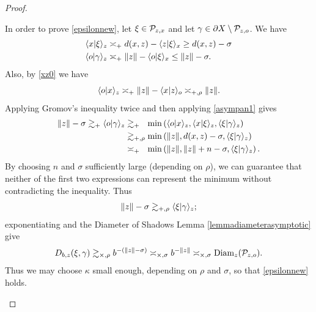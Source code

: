\begin{proof}
\begin{subproof}
In order to prove \eqref{epsilonnew}, let $\xi\in \mathcal P_{z,x}$ and let $\gamma\in \partial X\setminus \mathcal P_{z,o}$. We have
\begin{align*}
\langle x|\xi\rangle_z &\asymp_+ d(x,z) - \langle z|\xi\rangle_x \geq d(x,z) - \sigma\\
\langle o|\gamma\rangle_z &\asymp_+ \|z\| - \langle o|\xi\rangle_x \leq \|z\| - \sigma.
\end{align*}
Also, by \eqref{xz0} we have
\[
\langle o|x\rangle_z \asymp_+ \|z\| - \langle x|z\rangle_o \asymp_{+,\rho} \|z\|.
\]
Applying Gromov's inequality twice and then applying \eqref{asympan1} gives
\begin{align*}
\|z\| - \sigma \gtrsim_+ \langle o|\gamma\rangle_z
&\gtrsim_{+\phantom{,\rho}} \min\left(\langle o|x\rangle_z,\langle x|\xi\rangle_z,\langle \xi|\gamma\rangle_z\right)\\
&\gtrsim_{+,\rho} \min\left(\|z\|,d(x,z) - \sigma,\langle \xi|\gamma\rangle_z\right)\\
&\asymp_{+\phantom{,\rho}} \min\left(\|z\|,\|z\| + n - \sigma,\langle \xi|\gamma\rangle_z\right).
\end{align*}
By choosing $n$ and $\sigma$ sufficiently large (depending on $\rho$), we can guarantee that neither of the first two expressions can represent the minimum without contradicting the inequality. Thus
\[
\|z\| - \sigma \gtrsim_{+,\rho} \langle\xi|\gamma\rangle_z;
\]
exponentiating and the Diameter of Shadows Lemma \ref{lemmadiameterasymptotic} give
\[
D_{b,z}(\xi,\gamma)
\gtrsim_{\times,\rho} b^{-(\|z\| - \sigma)}
\asymp_{\times,\sigma} b^{-\|z\|}
\asymp_{\times,\sigma} \operatorname{Diam}_z(\mathcal P_{z,o}).
\]
Thus we may choose $\kappa$ small enough, depending on $\rho$ and $\sigma$, so that \eqref{epsilonnew} holds.
\end{subproof}
\end{proof}
